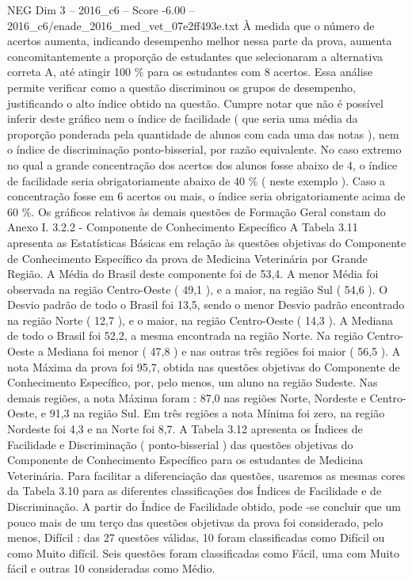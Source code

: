 \begin{textsample}{NEG Dim 3 – 2016\_c6 – Score -6.00 – 2016\_c6/enade\_2016\_med\_vet\_07e2ff493e.txt}
À medida que o número de acertos aumenta, indicando desempenho melhor nessa parte da prova, aumenta concomitantemente a proporção de estudantes que selecionaram a alternativa correta A, até atingir 100 \% para os estudantes com 8 acertos.
Essa análise permite verificar como a questão discriminou os grupos de desempenho, justificando o alto índice obtido na questão.
Cumpre notar que não é possível inferir deste gráfico nem o índice de facilidade ( que seria uma média da proporção ponderada pela quantidade de alunos com cada uma das notas ), nem o índice de discriminação ponto-bisserial, por razão equivalente.
No caso extremo no qual a grande concentração dos acertos dos alunos fosse abaixo de 4, o índice de facilidade seria obrigatoriamente abaixo de 40 \% ( neste exemplo ).
Caso a concentração fosse em 6 acertos ou mais, o índice seria obrigatoriamente acima de 60 \%.
Os gráficos relativos às demais questões de Formação Geral constam do Anexo I. 3.2.2 - Componente de Conhecimento Específico A Tabela 3.11 apresenta as Estatísticas Básicas em relação às questões objetivas do Componente de Conhecimento Específico da prova de Medicina Veterinária por Grande Região.
A Média do Brasil deste componente foi de 53,4.
A menor Média foi observada na região Centro-Oeste ( 49,1 ), e a maior, na região Sul ( 54,6 ).
O Desvio padrão de todo o Brasil foi 13,5, sendo o menor Desvio padrão encontrado na região Norte ( 12,7 ), e o maior, na região Centro-Oeste ( 14,3 ).
A Mediana de todo o Brasil foi 52,2, a mesma encontrada na região Norte.
Na região Centro-Oeste a Mediana foi menor ( 47,8 ) e nas outras três regiões foi maior ( 56,5 ).
A nota Máxima da prova foi 95,7, obtida nas questões objetivas do Componente de Conhecimento Específico, por, pelo menos, um aluno na região Sudeste.
Nas demais regiões, a nota Máxima foram : 87,0 nas regiões Norte, Nordeste e Centro-Oeste, e 91,3 na região Sul.
Em três regiões a nota Mínima foi zero, na região Nordeste foi 4,3 e na Norte foi 8,7.
A Tabela 3.12 apresenta os Índices de Facilidade e Discriminação ( ponto-bisserial ) das questões objetivas do Componente de Conhecimento Específico para os estudantes de Medicina Veterinária.
Para facilitar a diferenciação das questões, usaremos as mesmas cores da Tabela 3.10 para as diferentes classificações dos Índices de Facilidade e de Discriminação.
A partir do Índice de Facilidade obtido, pode -se concluir que um pouco mais de um terço das questões objetivas da prova foi considerado, pelo menos, Difícil : das 27 questões válidas, 10 foram classificadas como Difícil ou como Muito difícil.
Seis questões foram classificadas como Fácil, uma com Muito fácil e outras 10 consideradas como Médio.

\end{textsample}
